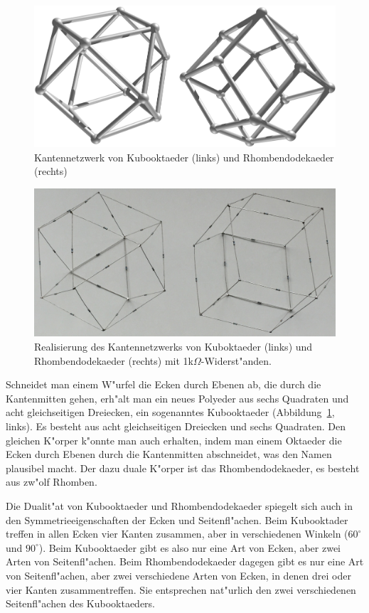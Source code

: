 \documentclass[a4paper,12pt]{article}
\begin{document}
\begin{figure}
\centering
\includegraphics[width=\hsize]{kubooktaeder.jpg}
\caption{Kantennetzwerk von Kubooktaeder (links) und Rhombendodekaeder (rechts)
\label{kantennetzwerke}}
\end{figure}
\begin{figure}
\centering
\includegraphics[width=\hsize]{realization.jpg}
\caption{Realisierung des Kantennetzwerks von Kuboktaeder (links)
und Rhombendodekaeder (rechts) mit 1k$\Omega$-Widerst"anden.
\label{realization}}
\end{figure}
Schneidet man einem W"urfel die Ecken durch Ebenen ab, die durch die Kantenmitten
gehen, erh"alt man ein neues Polyeder aus sechs Quadraten und acht gleichseitigen
Dreiecken, ein sogenanntes Kubooktaeder (Abbildung~\ref{kantennetzwerke}, links).
Es besteht aus acht gleichseitigen Dreiecken und sechs Quadraten.
Den gleichen K"orper k"onnte man auch erhalten, indem man einem Oktaeder
die Ecken durch Ebenen durch die Kantenmitten abschneidet,
was den Namen plausibel macht.
Der dazu duale K"orper ist das Rhombendodekaeder, es besteht aus zw"olf Rhomben.

Die Dualit"at von Kubooktaeder und Rhombendodekaeder spiegelt sich auch in
den Symmetrieeigenschaften der Ecken und Seitenfl"achen.
Beim Kubooktader treffen in allen Ecken vier Kanten zusammen, aber in
verschiedenen Winkeln ($60^\circ$ und $90^\circ$).
Beim Kubooktaeder gibt es also nur eine Art von Ecken, aber zwei Arten von
Seitenfl"achen.
Beim Rhombendodekaeder dagegen gibt es nur eine Art von Seitenfl"achen,
aber zwei verschiedene Arten von Ecken, in denen drei oder vier
Kanten zusammentreffen.
Sie entsprechen nat"urlich den zwei verschiedenen Seitenfl"achen des 
Kubooktaeders.
\end{document}
